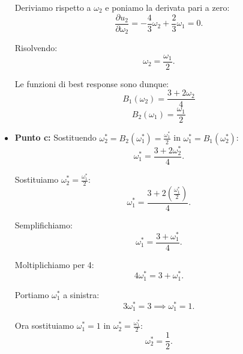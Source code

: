 \documentclass[a4paper,12pt]{article}
\begin{document}
\begin{itemize}
		Deriviamo rispetto a $\omega_2$ e poniamo la derivata pari a zero:
		\[
		\frac{\partial u_2}{\partial \omega_2} = - \frac{4}{3} \omega_2 + \frac{2}{3} \omega_1 = 0.
		\]
		
		Risolvendo:
		\[
		\omega_2 = \frac{ \omega_1}{2}.
		\]
		
		Le funzioni di best response sono dunque:
		\[
		B_1(\omega_2)=\frac{3 + 2 \omega_2}{4}
		\]
		\[
		B_2(\omega_1)=\frac{ \omega_1}{2}
		\]
		\item \textbf{Punto c: }
		Sostituendo $\omega_2^* = B_2(\omega_1^*) = \frac{\omega_1^*}{2}$ in $\omega_1^* = B_1(\omega_2^*)$:
		\[
		\omega_1^* = \frac{3 + 2\omega_2^*}{4}.
		\]
		
		Sostituiamo $\omega_2^* = \frac{\omega_1^*}{2}$:
		\[
		\omega_1^* = \frac{3 + 2\left(\frac{\omega_1^*}{2}\right)}{4}.
		\]
		
		Semplifichiamo:
		\[
		\omega_1^* = \frac{3 + \omega_1^*}{4}.
		\]
		
		Moltiplichiamo per 4:
		\[
		4\omega_1^* = 3 + \omega_1^*.
		\]
		
		Portiamo $\omega_1^*$ a sinistra:
		\[
		3\omega_1^* = 3 \implies \omega_1^* = 1.
		\]
		
		Ora sostituiamo $\omega_1^* = 1$ in $\omega_2^* = \frac{\omega_1^*}{2}$:
		\[
		\omega_2^* = \frac{1}{2}.
		\]
		
	\end{itemize}
	
\end{document}
